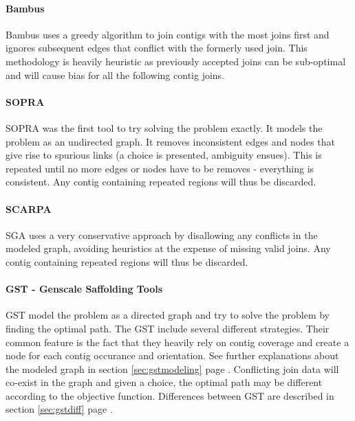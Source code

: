 \documentclass[12pt]{article}
\newcommand*{\fulleref}[1]{section \hyperref[{#1}] {\ref*{#1}} page {\pageref{#1}}}%
\begin{document}
\paragraph*{Bambus}
Bambus uses a greedy algorithm to join contigs with the most joins first and ignores subsequent edges that conflict with the formerly used join. This methodology is heavily heuristic as previously accepted joins can be sub-optimal and will cause bias for all the following contig joins.

\paragraph*{SOPRA} SOPRA was the first tool to try solving the problem exactly. It models the problem as an undirected graph. It removes inconsistent edges and nodes that give rise to spurious links (a choice is presented, ambiguity ensues). This is repeated until no more edges or nodes have to be removes - everything is consistent. Any contig containing repeated regions will thus be discarded.

\paragraph*{SCARPA} SGA uses a very conservative approach by disallowing any conflicts in the modeled graph, avoiding heuristics at the expense of missing valid joins. Any contig containing repeated regions will thus be discarded.

\paragraph*{GST - Genscale Saffolding Tools}
GST model the problem as a directed graph and try to solve the problem by finding the optimal path. The GST include several different strategies. Their common feature is the fact that they heavily rely on contig coverage and create a node for each contig occurance and orientation. See further explanations about the modeled graph in \fulleref{sec:gstmodeling}. Conflicting join data will co-exist in the graph and given a choice, the optimal path may be different according to the objective function. Differences between GST are described in \fulleref{sec:gstdiff}. 
\end{document}
